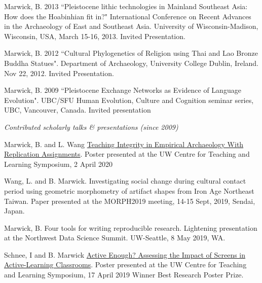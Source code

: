 \ind Marwick, B. 2013 ``Pleistocene lithic technologies in Mainland Southeast Asia: How does the Hoabinhian fit in?"  International Conference on Recent Advances in the Archaeology of East and Southeast Asia. University of Wisconsin-Madison, Wisconsin, USA, March 15-16, 2013. Invited Presentation.

\ind Marwick, B. 2012 ``Cultural Phylogenetics of Religion using Thai and Lao Bronze Buddha Statues". Department of Archaeology, University College Dublin, Ireland. Nov 22, 2012. Invited Presentation.

\ind Marwick, B. 2009 ``Pleistocene Exchange Networks as Evidence of Language Evolution".  UBC/SFU Human Evolution, Culture and Cognition seminar series, UBC, Vancouver, Canada. Invited presentation

\bigskip



\noindent\emph{Contributed scholarly talks \& presentations (since 2009)\vspace{0.01in}}

\medskip

\ind Marwick, B. and L. Wang \href{https://www.washington.edu/teaching/2020/04/02/34-teaching-integrity-in-empirical-archaeology-with-replication-assignments/}{Teaching Integrity in Empirical Archaeology With Replication Assignments}. Poster presented at the UW Centre for Teaching and Learning Symposium, 2 April 2020   

\ind Wang, L. and B. Marwick. Investigating social change during cultural contact period using geometric morphometry of artifact shapes from Iron Age Northeast Taiwan. Paper presented at the MORPH2019 meeting, 14-15 Sept, 2019, Sendai, Japan.

\ind Marwick, B. Four tools for writing reproducible research. Lightening presentation at the Northwest Data Science Summit. UW-Seattle, 8 May 2019, WA. 

\ind Schnee, I and B. Marwick \href{https://www.washington.edu/teaching/files/2019/04/Schnee.Ian_.pdf}{Active Enough? Assessing the Impact of Screens in Active-Learning Classrooms}. Poster presented at the UW Centre for Teaching and Learning Symposium, 17 April 2019 Winner Best Research Poster Prize. 

